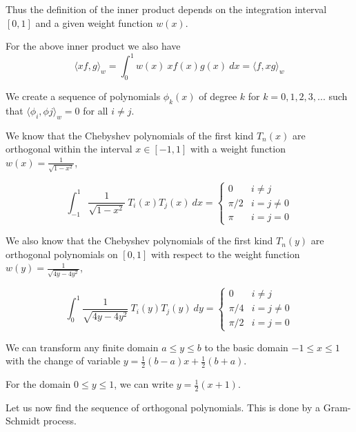 \documentclass[a4paper,11pt]{report}
\begin{document}
\begin{enumerate}
    Thus the definition of the inner product depends on the integration interval $[0, 1]$ and a given weight function $w(x)$.

    For the above inner product we also have
    \begin{equation*}
    \langle xf, g \rangle_{w} = \int_{0}^{1} w(x)\ x f(x) g(x)\ dx = \langle f, xg \rangle_{w}
    \end{equation*}

    We create a sequence of polynomials $\phi_{k}(x)$ of degree $k$ for $k = 0, 1, 2, 3, ...$ such that
    $\langle \phi_{i}, \phi{j} \rangle_{w} = 0$ for all $i \neq j$.

    We know that the Chebyshev polynomials of the first kind $T_{n}(x)$ are orthogonal within the interval $x \in [-1, 1]$ with a weight function 
    $w(x) = \displaystyle \frac{1}{\sqrt{1 - x^{2}}}$,

    \begin{equation*}
    \int_{-1}^{1} \frac{1}{\sqrt{1 - x^2}}\ T_{i}(x) T_{j}(x)\ dx = 
    \begin{cases}
        0 & i \neq j \\
        \pi/2 & i = j \neq 0 \\
        \pi & i = j = 0
    \end{cases}
    \end{equation*}

    We also know that the Chebyshev polynomials of the first kind $T_{n}(y)$ are orthogonal polynomials on $[0,1]$ with respect to the weight function
    $w(y) = \displaystyle \frac{1}{\sqrt{4y - 4y^2}}$,

    \begin{equation*}
    \int_{0}^{1} \frac{1}{\sqrt{4y - 4y^2}}\ T_{i}(y) T_{j}(y)\ dy = 
    \begin{cases}
        0 & i \neq j \\
        \pi/4 & i = j \neq 0 \\
        \pi/2 & i = j = 0
    \end{cases}
    \end{equation*}

    We can transform any finite domain $a \le y \le b$ to the basic domain $-1 \le x \le 1$ with the change of variable
    $y = \displaystyle \frac{1}{2} (b - a)x + \frac{1}{2} (b + a)$.

    For the domain $0 \le y \le 1$, we can write $y = \displaystyle \frac{1}{2} (x + 1)$.
    
    Let us now find the sequence of orthogonal polynomials. This is done by a Gram-Schmidt process. 


\end{enumerate}
\end{document}
